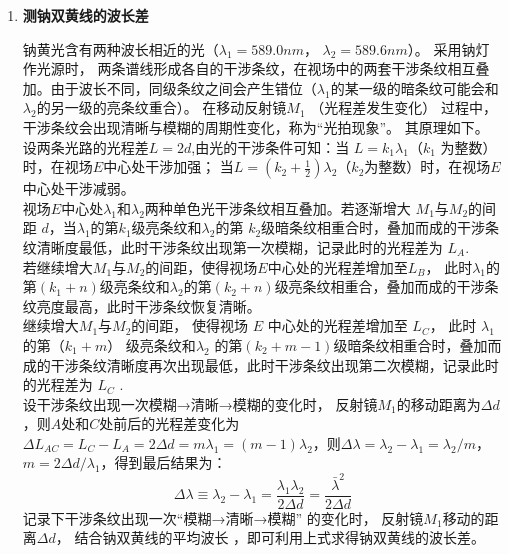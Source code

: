\documentclass[dvipsnames, svgnames,a4paper,11pt]{article}
\begin{document}
	\begin{enumerate}
		\item \textbf{测钠双黄线的波长差}
			
			钠黄光含有两种波长相近的光（$\lambda_1 = 589.0 nm$， $\lambda_2 = 589.6 nm$）。 采用钠灯作光源时， 两条谱线形成各自的干涉条纹，在视场中的两套干涉条纹相互叠加。由于波长不同，同级条纹之间会产生错位（$\lambda_1$的某一级的暗条纹可能会和 $\lambda_2$的另一级的亮条纹重合）。 在移动反射镜$M_1$ （光程差发生变化） 过程中，干涉条纹会出现清晰与模糊的周期性变化，称为“光拍现象”。 其原理如下。\\
			
			设两条光路的光程差$L=2d$,由光的干涉条件可知：当 $L = k_1 \lambda_1$（$k_1$ 为整数）时，在视场$E$中心处干涉加强； 当$L=(k_2+\frac{1}{2})\lambda_2$（$k_2$为整数）时，在视场$E$ 中心处干涉减弱。\\
			
			视场$E$中心处$\lambda_1$和$\lambda_2$两种单色光干涉条纹相互叠加。若逐渐增大 $M_1$与$ M_2 $的间距 $d$，当$\lambda_1$的第$ k_1$级亮条纹和$\lambda_2$的第 $ k_2$级暗条纹相重合时，叠加而成的干涉条纹清晰度最低，此时干涉条纹出现第一次模糊，记录此时的光程差为 $L_A$. \\     %
			
			
			若继续增大$M_1$与$ M_2 $的间距，使得视场$ E $中心处的光程差增加至$ L_B$， 此时$\lambda_1$的第$(k_1+n)$级亮条纹和$\lambda_2$的第$(k_2+n)$级亮条纹相重合，叠加而成的干涉条纹亮度最高，此时干涉条纹恢复清晰。\\
			
			继续增大$M_1$与$M_2$的间距， 使得视场 $E$ 中心处的光程差增加至 $L_C$， 此时 $\lambda_1$的第$（k_1+m）$ 级亮条纹和$\lambda_2$ 的第$ (k_2 + m - 1) $级暗条纹相重合时，叠加而成的干涉条纹清晰度再次出现最低，此时干涉条纹出现第二次模糊，记录此时的光程差为 $L_C$ .\\
			
			设干涉条纹出现一次模糊→清晰→模糊的变化时， 反射镜$ M_1 $的移动距离为$\Delta d$，则$A $处和$ C $处前后的光程差变化为$\Delta L_{AC}=L_C-L_A=2\Delta d=m\lambda_1=(m-1)\lambda_2$，则$\Delta \lambda=\lambda_2-\lambda_1=\lambda_2/m$，$m=2\Delta d/\lambda_1$，得到最后结果为：
			\[ \Delta \lambda\equiv\lambda_2-\lambda_1=\frac{\lambda_1\lambda_2}{2\Delta d}=\frac{\bar{\lambda}^2}{2\Delta d} 
			\]
			记录下干涉条纹出现一次“模糊→清晰→模糊” 的变化时， 反射镜$ M_1 $移动的距离$\Delta d$， 结合钠双黄线的平均波长 ，即可利用上式求得钠双黄线的波长差。\\
			

\end{enumerate}
\end{document}
